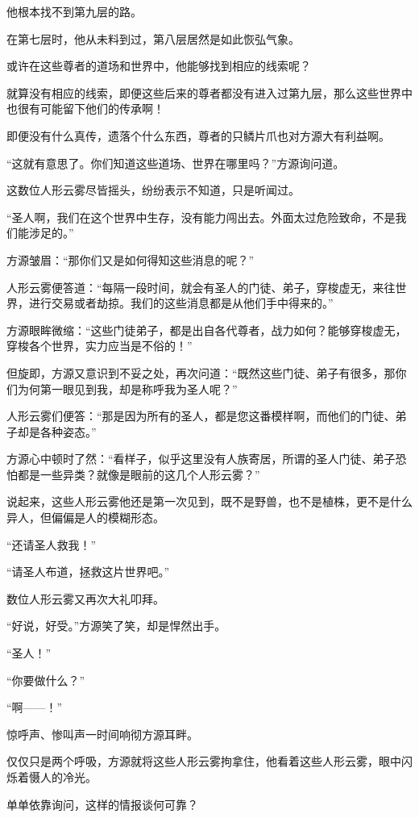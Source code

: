 \begin{this_body}
他根本找不到第九层的路。

在第七层时，他从未料到过，第八层居然是如此恢弘气象。

或许在这些尊者的道场和世界中，他能够找到相应的线索呢？

就算没有相应的线索，即便这些后来的尊者都没有进入过第九层，那么这些世界中也很有可能留下他们的传承啊！

即便没有什么真传，遗落个什么东西，尊者的只鳞片爪也对方源大有利益啊。

“这就有意思了。你们知道这些道场、世界在哪里吗？”方源询问道。

这数位人形云雾尽皆摇头，纷纷表示不知道，只是听闻过。

“圣人啊，我们在这个世界中生存，没有能力闯出去。外面太过危险致命，不是我们能涉足的。”

方源皱眉：“那你们又是如何得知这些消息的呢？”

人形云雾便答道：“每隔一段时间，就会有圣人的门徒、弟子，穿梭虚无，来往世界，进行交易或者劫掠。我们的这些消息都是从他们手中得来的。”

方源眼眸微缩：“这些门徒弟子，都是出自各代尊者，战力如何？能够穿梭虚无，穿梭各个世界，实力应当是不俗的！”

但旋即，方源又意识到不妥之处，再次问道：“既然这些门徒、弟子有很多，那你们为何第一眼见到我，却是称呼我为圣人呢？”

人形云雾们便答：“那是因为所有的圣人，都是您这番模样啊，而他们的门徒、弟子却是各种姿态。”

方源心中顿时了然：“看样子，似乎这里没有人族寄居，所谓的圣人门徒、弟子恐怕都是一些异类？就像是眼前的这几个人形云雾？”

说起来，这些人形云雾他还是第一次见到，既不是野兽，也不是植株，更不是什么异人，但偏偏是人的模糊形态。

“还请圣人救我！”

“请圣人布道，拯救这片世界吧。”

数位人形云雾又再次大礼叩拜。

“好说，好受。”方源笑了笑，却是悍然出手。

“圣人！”

“你要做什么？”

“啊——！”

惊呼声、惨叫声一时间响彻方源耳畔。

仅仅只是两个呼吸，方源就将这些人形云雾拘拿住，他看着这些人形云雾，眼中闪烁着慑人的冷光。

单单依靠询问，这样的情报谈何可靠？


\end{this_body}
